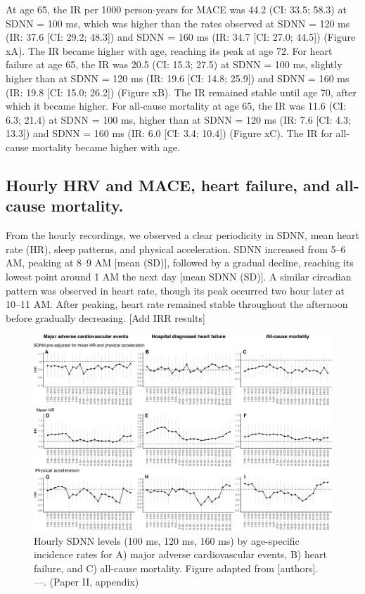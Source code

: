 \documentclass[
  a4paper,
  headsepline=true,
  open=any]{scrbook}
\begin{document}
At age 65, the IR per 1000 person-years for MACE was 44.2 (CI: 33.5;
58.3) at SDNN = 100 ms, which was higher than the rates observed at SDNN
= 120 ms (IR: 37.6 {[}CI: 29.2; 48.3{]}) and SDNN = 160 ms (IR: 34.7
{[}CI: 27.0; 44.5{]}) (Figure xA). The IR became higher with age,
reaching its peak at age 72. For heart failure at age 65, the IR was
20.5 (CI: 15.3; 27.5) at SDNN = 100 ms, slightly higher than at SDNN =
120 ms (IR: 19.6 {[}CI: 14.8; 25.9{]}) and SDNN = 160 ms (IR: 19.8
{[}CI: 15.0; 26.2{]}) (Figure xB). The IR remained stable until age 70,
after which it became higher. For all-cause mortality at age 65, the IR
was 11.6 (CI: 6.3; 21.4) at SDNN = 100 ms, higher than at SDNN = 120 ms
(IR: 7.6 {[}CI: 4.3; 13.3{]}) and SDNN = 160 ms (IR: 6.0 {[}CI: 3.4;
10.4{]}) (Figure xC). The IR for all-cause mortality became higher with
age.

\hypertarget{hourly-hrv-and-mace-heart-failure-and-all-cause-mortality.}{%
\subsection{Hourly HRV and MACE, heart failure, and all-cause
mortality.}\label{hourly-hrv-and-mace-heart-failure-and-all-cause-mortality.}}

From the hourly recordings, we observed a clear periodicity in SDNN,
mean heart rate (HR), sleep patterns, and physical acceleration. SDNN
increased from 5--6 AM, peaking at 8--9 AM {[}mean (SD){]}, followed by
a gradual decline, reaching its lowest point around 1 AM the next day
{[}mean SDNN (SD){]}. A similar circadian pattern was observed in heart
rate, though its peak occurred two hour later at 10--11 AM. After
peaking, heart rate remained stable throughout the afternoon before
gradually decreasing. {[}Add IRR results{]}

\begin{figure}

{\centering \includegraphics[width=6.5in,height=\textheight]{images/figure_ADD_PRO_risk_by_hour.pdf}

}

\caption{Hourly SDNN levels (100 ms, 120 ms, 160 ms) by age-specific
incidence rates for A) major adverse cardiovascular events, B) heart
failure, and C) all-cause mortality. Figure adapted from {[}authors{]}.
---. (Paper II, appendix)}

\end{figure}
\end{document}
